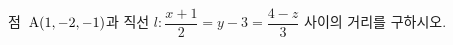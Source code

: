 점~$\mathrm{A}(1{,}\mkern3mu\mathopen{}-2{,}\mkern3mu\mathopen{}-1)$과 직선 $l\colon \dfrac{x+1}{2}=y-3=\dfrac{4-z}{3}$ 사이의 거리를 구하시오.

